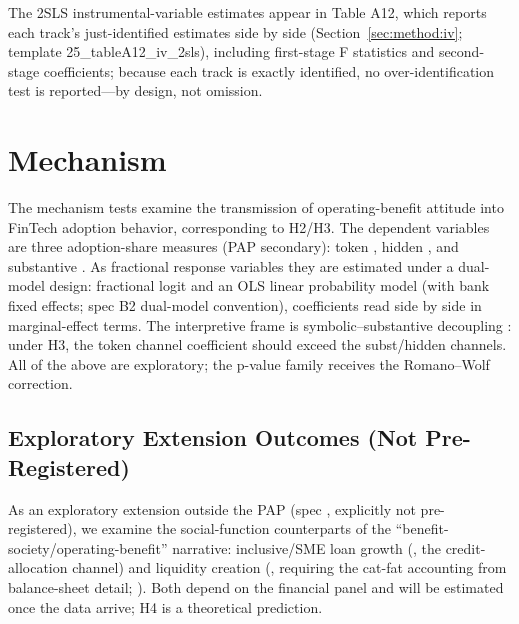 The 2SLS instrumental-variable estimates appear in Table A12, which
reports each track's just-identified estimates side by side
(Section~\ref{sec:method:iv}; template 25\_tableA12\_iv\_2sls),
including first-stage F statistics and second-stage coefficients;
because each track is exactly identified, no over-identification test
is reported---by design, not omission.

\section{Mechanism}\label{sec:mech}
The mechanism tests examine the transmission of operating-benefit
attitude into FinTech adoption behavior, corresponding to H2/H3. The
dependent variables are three adoption-share measures (PAP secondary):
token , hidden
, and substantive
. As fractional response variables they are
estimated under a dual-model design: fractional logit
\parencite{papke1996fractional} and an OLS linear probability model
(with bank fixed effects; spec B2 dual-model convention), coefficients
read side by side in marginal-effect terms. The interpretive frame is
symbolic--substantive decoupling
\parencite{westphal1994substance,fiss2006symbolic}: under H3, the token
channel coefficient should exceed the subst/hidden channels. All of
the above are exploratory; the p-value family receives the Romano--Wolf
correction.

\subsection{Exploratory Extension Outcomes (Not Pre-Registered)}\label{sec:mech:ext}
As an exploratory extension outside the PAP (spec
, explicitly not pre-registered),
we examine the social-function counterparts of the
``benefit-society/operating-benefit'' narrative: inclusive/SME loan
growth (, the credit-allocation channel)
and liquidity creation (, requiring the
cat-fat accounting from balance-sheet detail;
). Both depend
on the financial panel and will be estimated once the data arrive; H4
is a theoretical prediction.

